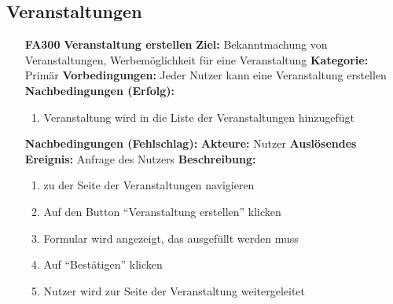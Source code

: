 \documentclass[parskip=full]{scrartcl}
\begin{document}
		\newpage
		\subsection{Veranstaltungen} \label{sec:FAVeranstaltungen}
		\begin{itemize}[nosep]
			
			\item[\textbf{FA300}]\textbf{Veranstaltung erstellen}
			\newline \textbf{Ziel:} Bekanntmachung von Veranstaltungen, Werbemöglichkeit für eine Veranstaltung
			\newline \textbf{Kategorie:} Primär
			\newline \textbf{Vorbedingungen:} Jeder Nutzer kann eine Veranstaltung erstellen
			\newline \textbf{Nachbedingungen (Erfolg):} 
			\begin{enumerate}[nosep]
				\item Veranstaltung wird in die Liste der Veranstaltungen hinzugefügt 
			\end{enumerate}
			\textbf{Nachbedingungen (Fehlschlag):}
			\newline \textbf{Akteure:} Nutzer
			\newline \textbf{Auslösendes Ereignis:} Anfrage des Nutzers
			\newline \textbf{Beschreibung:}
			\begin{enumerate}[nosep]
				\item zu der Seite der Veranstaltungen navigieren
				\item Auf den \gls{Button} “Veranstaltung erstellen” klicken
				\item Formular wird angezeigt, das ausgefüllt werden muss
				\item Auf “Bestätigen” klicken
				\item Nutzer wird zur Seite der Veranstaltung weitergeleitet\\
			\end{enumerate}
			

\end{itemize}
\end{document}
